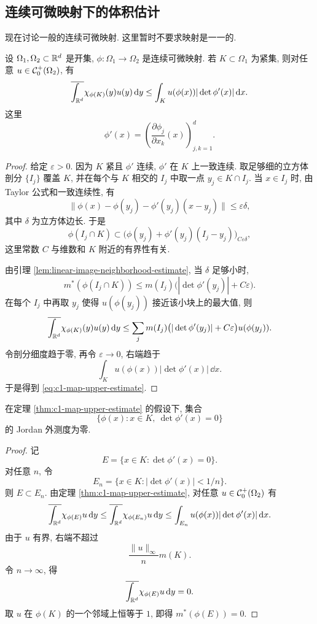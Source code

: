 \subsection{连续可微映射下的体积估计}

现在讨论一般的连续可微映射. 这里暂时不要求映射是一一的.

\begin{thm}\label{thm:c1-map-upper-estimate}
	设 \(\Omega_1,\Omega_2\subset\mathbb{R}^d\) 是开集, \(\phi:\Omega_1\to\Omega_2\) 是连续可微映射. 若 \(K\subset\Omega_1\) 为紧集, 则对任意 \(u\in\mathcal{C}_0^+(\Omega_2)\), 有
	\begin{equation}
		\overline{\int_{\mathbb{R}^d}}\chi_{\phi(K)}(y)u(y)\,\dd y
		\leq
		\int_K u(\phi(x))|\det\phi'(x)|\,\dd x.
		\label{eq:c1-map-upper-estimate}
	\end{equation}
	这里
	\[
	\phi'(x)=\left(\frac{\partial\phi_j}{\partial x_k}(x)\right)_{j,k=1}^{d}.
	\]
\end{thm}

\begin{proof}
	给定 \(\varepsilon>0\). 因为 \(K\) 紧且 \(\phi'\) 连续, \(\phi'\) 在 \(K\) 上一致连续. 取足够细的立方体剖分 \(\{I_j\}\) 覆盖 \(K\), 并在每个与 \(K\) 相交的 \(I_j\) 中取一点 \(y_j\in K\cap I_j\). 当 \(x\in I_j\) 时, 由 Taylor 公式和一致连续性, 有
	\[
	\|\phi(x)-\phi(y_j)-\phi'(y_j)(x-y_j)\|
	\leq \varepsilon\delta,
	\]
	其中 \(\delta\) 为立方体边长.
	于是
	\[
	\phi(I_j\cap K)\subset \bigl(\phi(y_j)+\phi'(y_j)(I_j-y_j)\bigr)_{C\varepsilon\delta},
	\]
	这里常数 \(C\) 与维数和 \(K\) 附近的有界性有关.
	
	由引理 \ref{lem:linear-image-neighborhood-estimate}, 当 \(\delta\) 足够小时,
	\[
	m^*(\phi(I_j\cap K))
	\leq
	m(I_j)\bigl(|\det\phi'(y_j)|+C\varepsilon\bigr).
	\]
	在每个 \(I_j\) 中再取 \(y_j\) 使得 \(u(\phi(y_j))\) 接近该小块上的最大值, 则
	\[
	\overline{\int_{\mathbb{R}^d}}\chi_{\phi(K)}(y)u(y)\,\dd y
	\leq
	\sum_j m(I_j)\bigl(|\det\phi'(y_j)|+C\varepsilon\bigr)u(\phi(y_j)).
	\]
	令剖分细度趋于零, 再令 \(\varepsilon\to0\), 右端趋于
	\[
	\int_K u(\phi(x))|\det\phi'(x)|\,\dd x.
	\]
	于是得到 \eqref{eq:c1-map-upper-estimate}.
\end{proof}

\begin{cor}
	\label{cor:morse-sard-c1-riemann}
	在定理 \ref{thm:c1-map-upper-estimate} 的假设下, 集合
	\[
	\bigl\{\phi(x):x\in K,\ \det\phi'(x)=0\bigr\}
	\]
	的 Jordan 外测度为零.
\end{cor}

\begin{proof}
	记
	\[
	E=\{x\in K:\det\phi'(x)=0\}.
	\]
	对任意 \(n\), 令
	\[
	E_n=\{x\in K:|\det\phi'(x)|<1/n\}.
	\]
	则 \(E\subset E_n\). 由定理 \ref{thm:c1-map-upper-estimate}, 对任意 \(u\in\mathcal{C}_0^+(\Omega_2)\) 有
	\[
	\overline{\int_{\mathbb{R}^d}}\chi_{\phi(E)}u\,\dd y
	\leq
	\overline{\int_{\mathbb{R}^d}}\chi_{\phi(E_n)}u\,\dd y
	\leq
	\int_{E_n}u(\phi(x))|\det\phi'(x)|\,\dd x.
	\]
	由于 \(u\) 有界, 右端不超过
	\[
	\frac{\|u\|_\infty}{n}m(K).
	\]
	令 \(n\to\infty\), 得
	\[
	\overline{\int_{\mathbb{R}^d}}\chi_{\phi(E)}u\,\dd y=0.
	\]
	取 \(u\) 在 \(\phi(K)\) 的一个邻域上恒等于 \(1\), 即得 \(m^*(\phi(E))=0\).
\end{proof}

